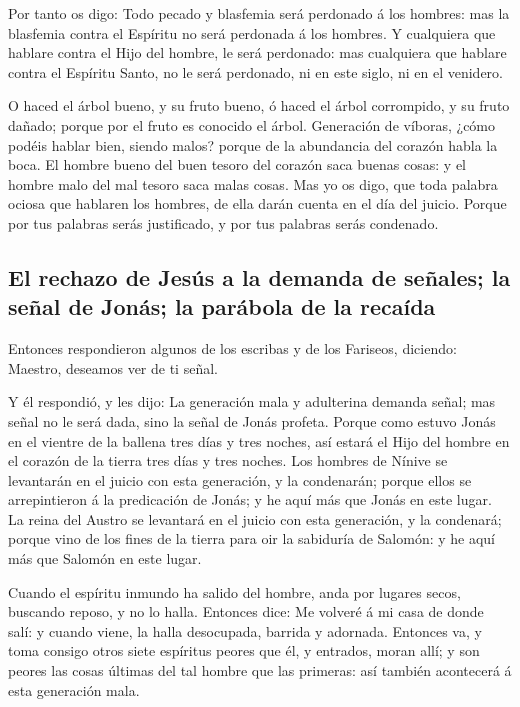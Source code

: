  Por tanto os digo: Todo pecado y blasfemia será
perdonado á los hombres: mas la blasfemia contra el Espíritu no será
perdonada á los hombres.  Y cualquiera que hablare contra
el Hijo del hombre, le será perdonado: mas cualquiera que hablare contra
el Espíritu Santo, no le será perdonado, ni en este siglo, ni en el
venidero.

 O haced el árbol bueno, y su fruto bueno, ó haced el
árbol corrompido, y su fruto dañado; porque por el fruto es conocido el
árbol.  Generación de víboras, ¿cómo podéis hablar bien,
siendo malos? porque de la abundancia del corazón habla la boca.
 El hombre bueno del buen tesoro del corazón saca buenas
cosas: y el hombre malo del mal tesoro saca malas cosas. 
Mas yo os digo, que toda palabra ociosa que hablaren los hombres, de
ella darán cuenta en el día del juicio.  Porque por tus
palabras serás justificado, y por tus palabras serás condenado.

\hypertarget{el-rechazo-de-jesuxfas-a-la-demanda-de-seuxf1ales-la-seuxf1al-de-jonuxe1s-la-paruxe1bola-de-la-recauxedda}{%
\subsection{El rechazo de Jesús a la demanda de señales; la señal de
Jonás; la parábola de la
recaída}\label{el-rechazo-de-jesuxfas-a-la-demanda-de-seuxf1ales-la-seuxf1al-de-jonuxe1s-la-paruxe1bola-de-la-recauxedda}}

 Entonces respondieron algunos de los escribas y de los
Fariseos, diciendo: Maestro, deseamos ver de ti señal.

 Y él respondió, y les dijo: La generación mala y
adulterina demanda señal; mas señal no le será dada, sino la señal de
Jonás profeta.  Porque como estuvo Jonás en el vientre de
la ballena tres días y tres noches, así estará el Hijo del hombre en el
corazón de la tierra tres días y tres noches.  Los
hombres de Nínive se levantarán en el juicio con esta generación, y la
condenarán; porque ellos se arrepintieron á la predicación de Jonás; y
he aquí más que Jonás en este lugar.  La reina del Austro
se levantará en el juicio con esta generación, y la condenará; porque
vino de los fines de la tierra para oir la sabiduría de Salomón: y he
aquí más que Salomón en este lugar.

 Cuando el espíritu inmundo ha salido del hombre, anda
por lugares secos, buscando reposo, y no lo halla. 
Entonces dice: Me volveré á mi casa de donde salí: y cuando viene, la
halla desocupada, barrida y adornada.  Entonces va, y
toma consigo otros siete espíritus peores que él, y entrados, moran
allí; y son peores las cosas últimas del tal hombre que las primeras:
así también acontecerá á esta generación mala.

